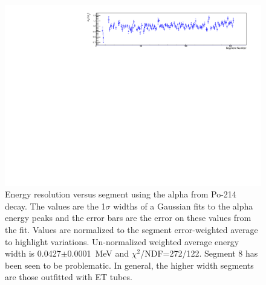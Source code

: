 \begin{figure}[!h]
\centering
\includegraphics[width=1.05\textwidth]{figures/PubBiPo214EresvsCell.pdf}
\caption{\label{fig:EresvsCell214}Energy resolution versus segment using the alpha from Po-214 decay. The values are the 1$\sigma$ widths of a Gaussian fits to the alpha energy peaks and the error bars are the error on these values from the fit. Values are normalized to the segment error-weighted average to highlight variations. Un-normalized weighted average energy width is 0.0427$\pm$0.0001~MeV and $\chi^2$/NDF=272/122. Segment 8 has been seen to be problematic. In general, the higher width segments are those outfitted with ET tubes.}
\end{figure}
\newpage
